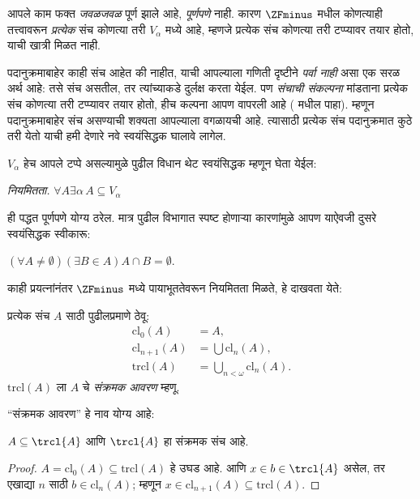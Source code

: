 \documentclass[../../../include/open-logic-section]{subfiles}
\begin{document}


आपले काम फक्त \emph{जवळजवळ} पूर्ण झाले आहे, \emph{पूर्णपणे} नाही. कारण $\ZFminus$ मधील कोणत्याही तत्त्वावरून \emph{प्रत्येक} संच कोणत्या तरी $V_\alpha$ मध्ये आहे, म्हणजे प्रत्येक संच कोणत्या तरी टप्प्यावर तयार होतो, याची खात्री मिळत नाही.

पदानुक्रमाबाहेर काही संच आहेत की नाहीत, याची आपल्याला गणिती दृष्टीने \emph{पर्वा नाही} असा एक सरळ अर्थ आहे: तसे संच असतील, तर त्यांच्याकडे दुर्लक्ष करता येईल. पण \emph{संचाची संकल्पना} मांडताना प्रत्येक संच कोणत्या तरी टप्प्यावर तयार होतो, हीच कल्पना आपण वापरली आहे ( मधील \stageshier{} पाहा). म्हणून पदानुक्रमाबाहेर संच असण्याची शक्यता आपल्याला वगळायची आहे. त्यासाठी प्रत्येक संच पदानुक्रमात कुठे तरी येतो याची हमी देणारे नवे स्वयंसिद्धक घालावे लागेल.

$V_\alpha$ हेच आपले टप्पे असल्यामुळे पुढील विधान थेट स्वयंसिद्धक म्हणून घेता येईल:

\begin{defish}
\emph{नियमितता.} $\forall A \exists \alpha\, A \subseteq V_\alpha$
\end{defish}

ही पद्धत पूर्णपणे योग्य ठरेल. मात्र पुढील विभागात स्पष्ट होणाऱ्या कारणांमुळे आपण याऐवजी दुसरे स्वयंसिद्धक स्वीकारू:

\begin{axiom}[पायाभूतता]
$(\forall A \neq \emptyset)(\exists B \in A)A \cap B = \emptyset$.
\end{axiom}

काही प्रयत्नांनंतर $\ZFminus$ मध्ये पायाभूततेवरून नियमितता मिळते, हे दाखवता येते:
\begin{defn}
प्रत्येक संच $A$ साठी पुढीलप्रमाणे ठेवू:
\begin{align*}
	\text{cl}_0(A) &= A,\\
	\text{cl}_{n+1}(A) &= \bigcup \text{cl}_n(A),\\
	\text{trcl}(A) &= \bigcup_{n < \omega} \text{cl}_{n}(A).
\end{align*}
$\text{trcl}(A)$ ला $A$ चे \emph{संक्रमक आवरण} म्हणू.
\end{defn}
\noindent
``संक्रमक आवरण'' हे नाव योग्य आहे:
\begin{prop}
$A \subseteq \trcl{A}$ आणि $\trcl{A}$ हा संक्रमक संच आहे.
\end{prop}

\begin{proof}
$A = \text{cl}_0(A) \subseteq \text{trcl}(A)$ हे उघड आहे. आणि $x
\in b \in \trcl{A}$ असेल, तर एखाद्या $n$ साठी $b \in \text{cl}_n(A)$; म्हणून $x
\in \text{cl}_{n+1}(A) \subseteq \text{trcl}(A)$.
\end{proof}
\end{document}
